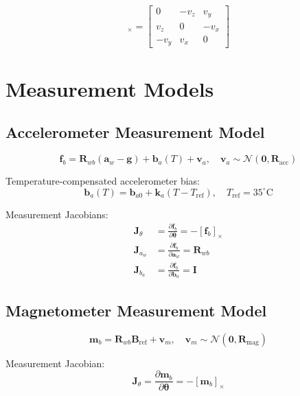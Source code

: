 \documentclass{article}
\newcommand{\vect}[1]{\bm{#1}}
\begin{document}
\begin{equation}
[\vect{v}]_\times = 
\begin{bmatrix}
0 & -v_z & v_y \\
v_z & 0 & -v_x \\
-v_y & v_x & 0
\end{bmatrix}
\end{equation}

\section{Measurement Models}

\subsection{Accelerometer Measurement Model}

\begin{equation}
\vect{f}_b = \vect{R}_{wb}(\vect{a}_w - \vect{g}) + \vect{b}_a(T) + \vect{v}_a, \quad \vect{v}_a \sim \mathcal{N}(\vect{0}, \vect{R}_{\text{acc}})
\end{equation}

Temperature-compensated accelerometer bias:
\begin{equation}
\vect{b}_a(T) = \vect{b}_{a0} + \vect{k}_a(T - T_{\text{ref}}), \quad T_{\text{ref}} = 35^\circ\text{C}
\end{equation}

Measurement Jacobians:
\begin{align}
\vect{J}_{\theta} &= \frac{\partial \vect{f}_b}{\partial \vect{\theta}} = -[\vect{f}_b]_\times \\
\vect{J}_{a_w} &= \frac{\partial \vect{f}_b}{\partial \vect{a}_w} = \vect{R}_{wb} \\
\vect{J}_{b_a} &= \frac{\partial \vect{f}_b}{\partial \vect{b}_a} = \vect{I}
\end{align}

\subsection{Magnetometer Measurement Model}

\begin{equation}
\vect{m}_b = \vect{R}_{wb} \vect{B}_{\text{ref}} + \vect{v}_m, \quad \vect{v}_m \sim \mathcal{N}(\vect{0}, \vect{R}_{\text{mag}})
\end{equation}

Measurement Jacobian:
\begin{equation}
\vect{J}_{\theta} = \frac{\partial \vect{m}_b}{\partial \vect{\theta}} = -[\vect{m}_b]_\times
\end{equation}
\end{document}
